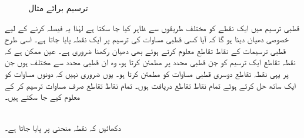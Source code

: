 \begin{figure}
\begin{subfigure}{0.30\textwidth}
\caption{}
\end{subfigure}
\caption{ترسیم برائے مثال }
\label{شکل_مثال_مخروط_کارتیسی_قطبی_ب}
\end{figure}



قطبی ترسیم میں ایک نقطے کو مختلف طریقوں سے ظاہر کیا جا سکتا ہے لہٰذا یہ فیصلہ کرنے کے لیے خصوصی دھیان دینا ہو گا کہ آیا کسی قطبی مساوات  کی ترسیم پر ایک  نقطہ پایا جاتا ہے۔ اسی طرح قطبی ترسیمات کے نقاط تقاطع معلوم کرتے ہوئے بھی دھیان رکھنا ضروری ہے۔  عین ممکن ہے کہ نقطہ تقاطع ایک ترسیم کو جن  قطبی محدد پر مطمئن کرتا ہو، وہ ان قطبی محدد سے مختلف ہوں جن پر یہی نقطہ تقاطع دوسری قطبی مساوات کو مطمئن کرتا ہو۔ یوں ضروری نہیں  کہ دونوں مساوات کو ایک ساتھ حل کرتے ہوئے تمام نقاط تقاطع دریافت ہوں۔  تمام نقاط تقاطع صرف مساوات  ترسیم کر کے معلوم کیے جا سکتے ہیں۔ 

\\
دکھائیں کہ نقطہ  منحنی  پر پایا جاتا ہے۔

